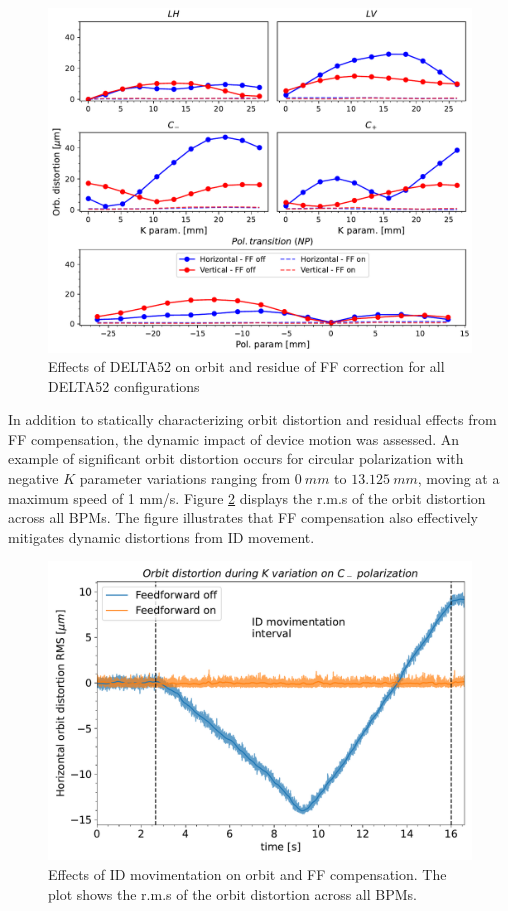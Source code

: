 \documentclass[a4paper,
               keeplastbox,   %
               ]{jacow}
\begin{document}
\begin{figure}[]
    \centering
   \includegraphics[width=\columnwidth]{THPS18_f2.pdf}
   \caption{Effects of DELTA52 on orbit and residue of FF correction for all DELTA52 configurations}
   \label{fig:orbit_slow}
\end{figure}

In addition to statically characterizing orbit distortion and residual effects from FF compensation, the dynamic impact of device motion was assessed. An example of significant orbit distortion occurs for circular polarization with negative $K$ parameter variations ranging from $\SI{0}{mm}$ to $\SI{13.125}{mm}$, moving at a maximum speed of 1 mm/s. Figure \ref{fig:orbit_fast} displays the r.m.s of the orbit distortion across all BPMs. The figure illustrates that FF compensation also effectively mitigates dynamic distortions from ID movement.

\begin{figure}[]
    \centering
   \includegraphics[width=0.7\columnwidth]{THPS18_f3.pdf}
   \caption{Effects of ID movimentation on orbit and FF compensation. The plot shows the r.m.s of the orbit distortion across all BPMs.}
   \label{fig:orbit_fast}
\end{figure}
\end{document}

